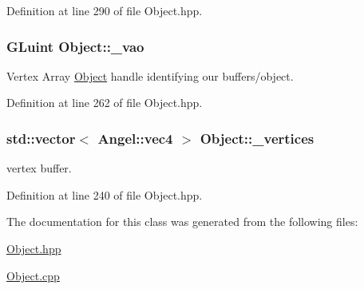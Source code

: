 Definition at line 290 of file Object.\-hpp.

\hypertarget{class_object_a564aa6b1df66a05ab6b6c2f071851c4e}{
\subsubsection[{\-\_\-vao}]{\setlength{\rightskip}{0pt plus 5cm}G\-Luint Object\-::\-\_\-vao\hspace{0.3cm}{\ttfamily [protected]}}}\label{class_object_a564aa6b1df66a05ab6b6c2f071851c4e}


Vertex Array \hyperlink{class_object}{Object} handle identifying our buffers/object. 



Definition at line 262 of file Object.\-hpp.

\hypertarget{class_object_a4ac354b3ec284f27358b1d4b8d95b9a9}{
\subsubsection[{\-\_\-vertices}]{\setlength{\rightskip}{0pt plus 5cm}std\-::vector$<$ {\bf Angel\-::vec4} $>$ Object\-::\-\_\-vertices}}\label{class_object_a4ac354b3ec284f27358b1d4b8d95b9a9}


vertex buffer. 



Definition at line 240 of file Object.\-hpp.



The documentation for this class was generated from the following files\-:\begin{DoxyCompactItemize}
\item 
\hyperlink{_object_8hpp}{Object.\-hpp}\item 
\hyperlink{_object_8cpp}{Object.\-cpp}\end{DoxyCompactItemize}
